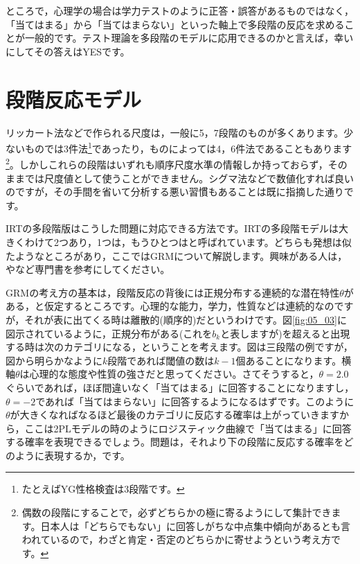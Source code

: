 \documentclass{ltjsbook}
\begin{document}
ところで，心理学の場合は学力テストのように正答・誤答があるものではなく，「当てはまる」から「当てはまらない」といった軸上で多段階の反応を求めることが一般的です。テスト理論を多段階のモデルに応用できるのかと言えば，幸いにしてその答えはYESです。
\section{段階反応モデル}
リッカート法などで作られる尺度は，一般に5，7段階のものが多くあります。少ないものでは3件法\footnote{たとえばYG性格検査は3段階です。}であったり，ものによっては4，6件法であることもあります\footnote{偶数の段階にすることで，必ずどちらかの極に寄るようにして集計できます。日本人は「どちらでもない」に回答しがちな中点集中傾向があるとも言われているので，わざと肯定・否定のどちらかに寄せようという考え方です。}。しかしこれらの段階はいずれも順序尺度水準の情報しか持っておらず，そのままでは尺度値として使うことができません。シグマ法などで数値化すれば良いのですが，その手間を省いて分析する悪い習慣もあることは既に指摘した通りです。

IRTの多段階版はこうした問題に対応できる方法です。IRTの多段階モデルは大きくわけて2つあり，1つは\textcite{samejima1997graded}，もうひとつは\textcite{muraki1992generalized}と呼ばれています。どちらも発想は似たようなところがあり，ここではGRMについて解説します。興味がある人は，\textcite{Toyoda20120824}や\textcite{Katoken2014}など専門書を参考にしてください。

GRMの考え方の基本は，段階反応の背後には正規分布する連続的な潜在特性$\theta$がある，と仮定するところです。心理的な能力，学力，性質などは連続的なのですが，それが表に出てくる時は離散的(順序的)だというわけです。図\ref{fig:05_03}に図示されているように，正規分布がある(これを$b_k$と表しますが)を超えると出現する時は次のカテゴリになる，ということを考えます。図は三段階の例ですが，図から明らかなように$k$段階であれば閾値の数は$k-1$個あることになります。横軸$\theta$は心理的な態度や性質の強さだと思ってください。さてそうすると，$\theta=2.0$ぐらいであれば，ほぼ間違いなく「当てはまる」に回答することになりますし，$\theta=-2$であれば「当てはまらない」に回答するようになるはずです。このように$\theta$が大きくなればなるほど最後のカテゴリに反応する確率は上がっていきますから，ここは2PLモデルの時のようにロジスティック曲線で「当てはまる」に回答する確率を表現できるでしょう。問題は，それより下の段階に反応する確率をどのように表現するか，です。
\end{document}
